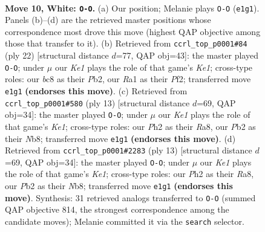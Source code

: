 \documentclass[11pt]{article}
\begin{document}
\clearpage

\begin{figure}[p]\centering
\begin{subfigure}{0.46\textwidth}\centering
\resizebox{\linewidth}{!}{%
\newchessgame
\chessboard[
  setfen={r1b1k2r/ppp1qpp1/2n2n2/3p3p/3P4/2B2NP1/PP2PPBP/R2QK2R w KQkq - 0 10},
  showmover=false,
  pgfstyle=straightmove, color=movearrow, markmove={e1-g1}
]}
\caption{}
\end{subfigure}\hfill
\begin{subfigure}{0.46\textwidth}\centering
\resizebox{\linewidth}{!}{%
\newchessgame
\chessboard[
  setfen={rn1r2k1/pppq1ppp/4pn2/8/3Pb2N/P1B1P3/1P2BPPP/R2QK2R w KQ - 3 12},
  showmover=false,
  pgfstyle=straightmove, color=movearrow, markmove={e1-g1}
]}
\caption{}
\end{subfigure}
\\[4pt]
\begin{subfigure}{0.46\textwidth}\centering
\resizebox{\linewidth}{!}{%
\newchessgame
\chessboard[
  setfen={rnbqk2r/pp2ppbp/3p1np1/8/2BPP3/2N2N2/PP3PPP/R1BQK2R b KQkq - 2 7},
  showmover=false,
  pgfstyle=straightmove, color=movearrow, markmove={e8-g8}
]}
\caption{}
\end{subfigure}\hfill
\begin{subfigure}{0.46\textwidth}\centering
\resizebox{\linewidth}{!}{%
\newchessgame
\chessboard[
  setfen={rnbqk2r/pp2ppbp/3p1np1/8/2BPP3/2N2N2/PP3PPP/R1BQK2R b KQkq - 2 7},
  showmover=false,
  pgfstyle=straightmove, color=movearrow, markmove={e8-g8}
]}
\caption{}
\end{subfigure}
\caption{\textbf{Move 10, White: \texttt{O-O}.} (a) Our position; Melanie plays \texttt{O-O} (\texttt{e1g1}). Panels (b)--(d) are the retrieved master positions whose correspondence most drove this move (highest QAP objective among those that transfer to it). (b) Retrieved from \texttt{ccrl\_top\_p0001\#84} (ply 22) [structural distance $d$=77, QAP obj=43]: the master played \texttt{O-O}; under $\mu$ our \emph{Ke1} plays the role of that game's \emph{Ke1}; cross-type roles: our \emph{b}c8 as their \emph{P}b2, our \emph{R}a1 as their \emph{P}f2; transferred move \texttt{e1g1} \textbf{(endorses this move)}. (c) Retrieved from \texttt{ccrl\_top\_p0001\#580} (ply 13) [structural distance $d$=69, QAP obj=34]: the master played \texttt{O-O}; under $\mu$ our \emph{Ke1} plays the role of that game's \emph{Ke1}; cross-type roles: our \emph{P}h2 as their \emph{R}a8, our \emph{P}b2 as their \emph{N}b8; transferred move \texttt{e1g1} \textbf{(endorses this move)}. (d) Retrieved from \texttt{ccrl\_top\_p0001\#2283} (ply 13) [structural distance $d$=69, QAP obj=34]: the master played \texttt{O-O}; under $\mu$ our \emph{Ke1} plays the role of that game's \emph{Ke1}; cross-type roles: our \emph{P}h2 as their \emph{R}a8, our \emph{P}b2 as their \emph{N}b8; transferred move \texttt{e1g1} \textbf{(endorses this move)}. Synthesis: 31 retrieved analogs transferred to \texttt{O-O} (summed QAP objective 814, the strongest correspondence among the candidate moves); Melanie committed it via the \texttt{search} selector.}
\label{fig:thought-m18}
\end{figure}
\end{document}
